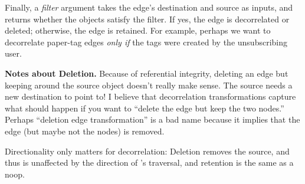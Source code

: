         Finally, a \emph{filter} argument takes 
        the edge's destination and source as inputs, and returns whether the objects satisfy the
        filter. If yes, the edge is decorrelated or deleted; otherwise, the edge is retained.
        For example, perhaps we want to decorrelate paper-tag edges
        \emph{only if} the tags were created by the unsubscribing user.

    \vspace{0.5\baselineskip}\noindent\textbf{Notes about Deletion.}
        Because of referential integrity, deleting an edge but keeping around the source object
        doesn't really make sense. The source needs a new destination to point to! I believe that
        decorrelation transformations capture what should happen if you want to ``delete the edge
        but keep the two nodes.'' Perhaps ``deletion edge transformation'' is a bad name because it
        implies that the edge (but maybe not the nodes) is removed.

        Directionality only matters for decorrelation: Deletion removes the source, and thus is unaffected by
        the direction of \sys's traversal, and retention is the same as a noop.

